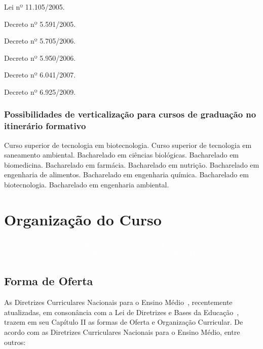 \documentclass[11pt,fleqn]{book} %
\begin{document}
Lei nº 11.105/2005. 

Decreto nº 5.591/2005. 

Decreto nº 5.705/2006. 

Decreto nº 5.950/2006. 

Decreto nº 6.041/2007.

Decreto nº 6.925/2009. 

\subsection{Possibilidades de verticalização para cursos de graduação no itinerário formativo}

Curso superior de tecnologia em biotecnologia. 
Curso superior de tecnologia em saneamento ambiental. 
Bacharelado em ciências biológicas. 
Bacharelado em biomedicina. 
Bacharelado em farmácia. 
Bacharelado em nutrição. 
Bacharelado em engenharia de alimentos. 
Bacharelado em engenharia química. 
Bacharelado em biotecnologia. 
Bacharelado em engenharia ambiental.


\chapter{Organização do Curso}
\vspace{6em}
\begin{flushright}
	\textit{\textcolor{white}{``O homem, por ser inacabado, tende à perfeição. A educação é, portanto, um
			processo contínuo que só acaba com a morte'' (FURTER, 1973).}}
\end{flushright}
\vspace{12em}

\section{Forma de Oferta}\label{carga}
\indent

As Diretrizes Curriculares Nacionais para o Ensino Médio~\cite{Resolucao032018}, recentemente atualizadas, em consonância com a Lei de Diretrizes e Bases da Educação~\cite{Lei19394De1996}, trazem em seu Capítulo II as formas de Oferta e Organização Curricular. 
De acordo com as Diretrizes Curriculares Nacionais para o Ensino Médio, entre outros:
\end{document}
